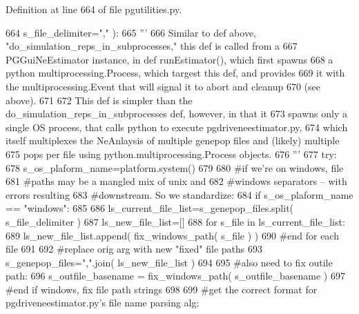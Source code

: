 Definition at line 664 of file pgutilities.\+py.


\begin{DoxyCode}
664                                         s\_file\_delimiter=\textcolor{stringliteral}{","} ):
665     \textcolor{stringliteral}{'''}
666 \textcolor{stringliteral}{    Similar to def above, "do\_simulation\_reps\_in\_subprocesses," this def is called from a}
667 \textcolor{stringliteral}{    PGGuiNeEstimator instance, in def runEstimator(), which first spawns}
668 \textcolor{stringliteral}{    a python multiprocessing.Process, which targest this def, and provides}
669 \textcolor{stringliteral}{    it with the multiprocessing.Event that will signal it to abort and cleanup}
670 \textcolor{stringliteral}{    (see above).}
671 \textcolor{stringliteral}{}
672 \textcolor{stringliteral}{    This def is simpler than the do\_simulation\_reps\_in\_subprocesses def, however, in that it}
673 \textcolor{stringliteral}{    spawns only a single OS process, that calls python to execute pgdriveneestimator.py,}
674 \textcolor{stringliteral}{    which itself multiplexes the NeAnlaysis of multiple genepop files and (likely) multiple}
675 \textcolor{stringliteral}{    pops per file using python.multiprocessing.Process objects.}
676 \textcolor{stringliteral}{    '''}
677     \textcolor{keywordflow}{try}:
678         s\_os\_plaform\_name=platform.system()
679         
680         \textcolor{comment}{#if we're on windows, file}
681         \textcolor{comment}{#paths may be a mangled mix of unix and }
682         \textcolor{comment}{#windows separators -- with errors resulting}
683         \textcolor{comment}{#downstream.  So we standardize:}
684         \textcolor{keywordflow}{if} s\_os\_plaform\_name == \textcolor{stringliteral}{"windows"}:
685 
686             ls\_current\_file\_list=s\_genepop\_files.split( s\_file\_delimiter )
687             ls\_new\_file\_list=[]
688             \textcolor{keywordflow}{for} s\_file \textcolor{keywordflow}{in} ls\_current\_file\_list:
689                 ls\_new\_file\_list.append( fix\_windows\_path( s\_file ) )
690             \textcolor{comment}{#end for each file}
691             
692             \textcolor{comment}{#replace orig arg with new "fixed" file paths}
693             s\_genepop\_files=\textcolor{stringliteral}{","}.join( ls\_new\_file\_list )
694 
695             \textcolor{comment}{#also need to fix outile path:}
696             s\_outfile\_basename = fix\_windows\_path( s\_outfile\_basename )
697         \textcolor{comment}{#end if windows, fix file path strings}
698 
699         \textcolor{comment}{#get the correct format for pgdriveneestimator.py's file name parsing alg:}

\end{DoxyCode}
